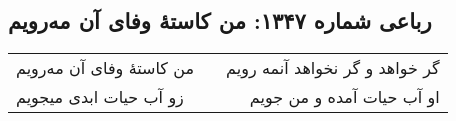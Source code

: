 \begin{center}
\section*{رباعی شماره ۱۳۴۷: من کاستهٔ وفای آن مه‌رویم}
\label{sec:1347}
\begin{longtable}{l p{0.5cm} r}
من کاستهٔ وفای آن مه‌رویم
&&
گر خواهد و گر نخواهد آنمه رویم
\\
زو آب حیات ابدی میجویم
&&
او آب حیات آمده و من جویم
\\
\end{longtable}
\end{center}
